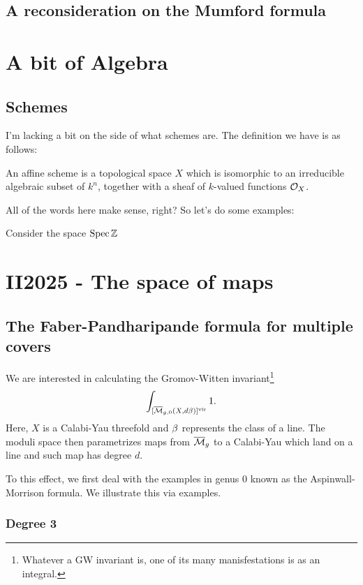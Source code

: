 \documentclass[12pt]{memoir}
\begin{document}
\section{A reconsideration on the Mumford formula}

\chapter{A bit of Algebra}

\section{Schemes}

I'm lacking a bit on the side of what schemes are. The definition we have is as follows:

\begin{Def}
    An affine scheme is a topological space $X$ which is isomorphic to an irreducible algebraic subset of $k^n$, together with a sheaf of $k$-valued functions $\mathcal{O}_X$.
\end{Def}

All of the words here make sense, right? So let's do some examples:

\begin{Ex}
    Consider the space $\operatorname{Spec}\mathbb{Z}$
\end{Ex}

\chapter{II2025 - The space of maps}

\section{The Faber-Pandharipande formula for multiple covers}

We are interested in calculating the Gromov-Witten invariant\footnote{Whatever a GW invariant is, one of its many manisfestations is as an integral.}
$$\int_{[\overline{\mathcal{M}}_{g,0}(X,d\beta)]^{\mathrm{vir}}}1.$$
Here, $X$ is a Calabi-Yau threefold and $\beta$ represents the class of a line. The moduli space then parametrizes maps from $\overline{\mathcal{M}}_g$ to a Calabi-Yau which land on a line and such map has degree $d$.\par
To this effect, we first deal with the examples in genus 0 known as the Aspinwall-Morrison formula. We illustrate this via examples.

\subsection{Degree 3}
\end{document}
